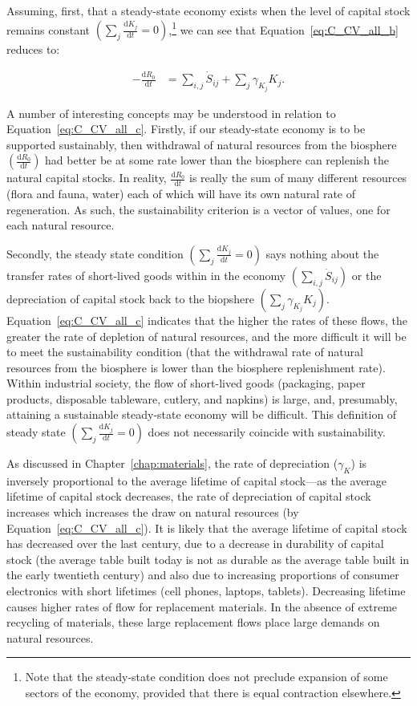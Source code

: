 Assuming,
first,
that a steady-state economy exists when the level
of capital stock remains constant
$\left(\sum_{j}\frac{\mathrm{d}K_{j}}{\mathrm{d}t}=0\right)$,\footnote{Note
that the steady-state condition does not preclude expansion
of some sectors of the economy, provided that there is 
equal contraction elsewhere.}
we can see that Equation~\ref{eq:C_CV_all_b}
reduces to:

\begin{align}\label{eq:C_CV_all_c}
	- \frac{\mathrm{d}R_{0}}{\mathrm{d}t}										&
	= \sum_{i,j}\dot{S}_{ij}
	+ \sum_{j}\gamma_{K_{j}}K_{j}.
\end{align}

A number of interesting concepts may be understood in
relation to Equation~\ref{eq:C_CV_all_c}. 
Firstly,
if our steady-state economy is to be supported
sustainably,
then withdrawal of natural resources from the biosphere
$\left(\frac{\mathrm{d}R_{0}}{\mathrm{d}t}\right)$
had better be at some rate lower than the biosphere
can replenish the natural capital stocks. 
In reality, 
$\frac{\mathrm{d}R_{0}}{\mathrm{d}t}$
is really the sum of many different resources
(flora and fauna, water) each of which will have
its own natural rate of regeneration.
As such, 
the sustainability criterion  is a vector of values,
one for each natural resource.

Secondly,
the steady state condition 
$\left(\sum_{j}\frac{\mathrm{d}K_{j}}{\mathrm{d}t}=0\right)$
says nothing about the transfer rates of short-lived goods 
within in the economy $\left(\sum_{i,j}\dot{S}_{ij}\right)$
or the depreciation of capital stock back to the biopshere
$\left(\sum_{j}\gamma_{K_{j}}K_{j}\right)$.
Equation~\ref{eq:C_CV_all_c} indicates that 
the higher the rates of these flows,
the greater the rate of depletion of
natural resources, and the more difficult it will be to
meet the sustainability condition 
(that the withdrawal rate of natural resources from the biosphere
is lower than the biosphere
replenishment rate).
Within industrial society,
the flow of short-lived goods 
(packaging,
paper products,
disposable tableware,
cutlery,
and napkins)
is large,
and, presumably, attaining a sustainable steady-state economy
will be difficult.
This definition of steady state 
$\left(\sum_{j}\frac{\mathrm{d}K_{j}}{\mathrm{d}t}=0\right)$
does not necessarily coincide with sustainability.

As discussed in Chapter~\ref{chap:materials},
the rate of depreciation ($\gamma_{K}$) is inversely
proportional to the average lifetime of capital stock---as
the average lifetime of capital stock decreases,
the rate of depreciation of capital stock increases which
increases the draw on natural resources (by Equation~\ref{eq:C_CV_all_c}).
It is likely that the average lifetime of capital stock has
decreased over the last century, 
due to a decrease in durability of capital stock
(the average table built today is not as durable as the average table
built in the early twentieth century)
and also due to increasing proportions of consumer electronics
with short lifetimes (cell phones, laptops, tablets).
Decreasing lifetime causes higher rates of flow for
replacement materials.
In the absence of extreme recycling of materials,
these large replacement flows place large demands on
natural resources.

